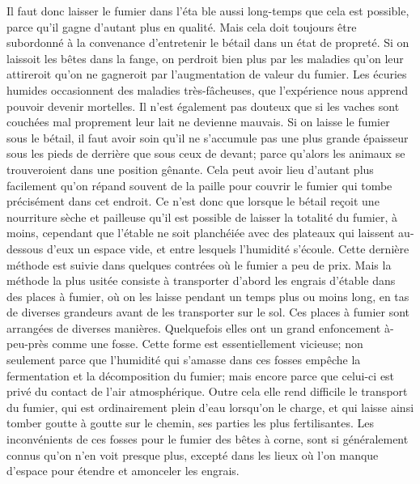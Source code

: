 Il faut donc laisser le fumier dans l'éta\setcounter{page}{301} ble aussi long-temps que cela est possible, parce qu'il gagne d'autant plus en qualité. Mais cela doit toujours être subordonné à la convenance d'entretenir le bétail dans un état de propreté. Si on laissoit les bêtes dans la fange, on perdroit bien plus par les maladies qu'on leur attireroit qu'on ne gagneroit par l'augmentation de valeur du fumier. Les écuries humides occasionnent des maladies très-fâcheuses, que l'expérience nous apprend pouvoir devenir mortelles. Il n'est également pas douteux que si les vaches sont couchées mal proprement leur lait ne devienne mauvais.
Si on laisse le fumier sous le bétail, il faut avoir soin qu'il ne s'accumule pas une plus grande épaisseur sous les pieds de derrière que sous ceux de devant; parce qu'alors les animaux se trouveroient dans une position gênante. Cela peut avoir lieu d'autant plus facilement qu'on répand souvent de la paille pour couvrir le fumier qui tombe précisément dans cet endroit. Ce n'est donc que lorsque le bétail reçoit une nourriture sèche et pailleuse qu'il est possible de laisser la totalité du fumier, à moins, cependant que l'étable ne soit planchéiée avec des plateaux qui laissent au-dessous d'eux un espace vide, et entre lesquels l'humidité\setcounter{page}{302} s'écoule. Cette dernière méthode est suivie dans quelques contrées où le fumier a peu de prix.
Mais la méthode la plus usitée consiste à transporter d'abord les engrais d'étable dans des places à fumier, où on les laisse pendant un temps plus ou moins long, en tas de diverses grandeurs avant de les transporter sur le sol.
Ces places à fumier sont arrangées de diverses manières. Quelquefois elles ont un grand enfoncement à-peu-près comme une fosse. Cette forme est essentiellement vicieuse; non seulement parce que l'humidité qui s'amasse dans ces fosses empêche la fermentation et la décomposition du fumier; mais encore parce que celui-ci est privé du contact de l'air atmosphérique. Outre cela elle rend difficile le transport du fumier, qui est ordinairement plein d'eau lorsqu'on le charge, et qui laisse ainsi tomber goutte à goutte sur le chemin, ses parties les plus fertilisantes. Les inconvénients de ces fosses pour le fumier des bêtes à corne, sont si généralement connus qu'on n'en voit presque plus, excepté dans les lieux où l'on manque d'espace pour étendre et amonceler les engrais.
